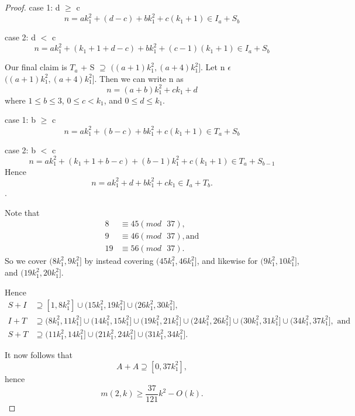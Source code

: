\begin{proof}
case 1: d $\geq$ c
\[
n = ak_1^2 + (d - c) + bk_1^2 + c(k_1 + 1) \in I_a + S_b
\]

case 2: d $<$ c
\[
n = ak_1^2 + (k_1 + 1 + d - c) + bk_1^2 + (c - 1)(k_1 + 1) \in  I_a + S_b
\]

Our final claim is $T_a$ + S $\supseteq$ $((a +1)k_1^2 ,  (a + 4)k_1^2]$. 
Let n $\epsilon$ $((a +1)k_1^2 ,  (a + 4)k_1^2]$.
Then we can write n as 
\[
n = (a + b) k_1^2 + ck_1 + d 
\]
where $1 \leq b \leq 3$, $0 \leq c < k_1$, and $0 \leq d \leq k_1$. 

case 1: b $\geq$ c
\[
n = ak_1^2 + (b - c) + bk_1^2 + c(k_1 + 1) \in T_a + S_b
\]

case 2: b $<$ c
\[
n = ak_1^2 + (k_1 + 1 + b - c) + (b - 1)k_1^2 + c(k_1 + 1) \in  T_a + S_{b-1}
\]
Hence 
\[
n = ak_1^2 + d + bk_1^2 + ck_1 \in I_a + T_b.
\].

Note that
\begin{align*}
8 &\equiv 45 (mod\text{ }37),\\
 9 &\equiv 46 (mod\text{ }37),  \text{and} \\
19 &\equiv 56 (mod\text{ }37).
\end{align*} 
So we cover $(8k_1^2, 9k_1^2]$ by instead covering $(45k_1^2, 46k_1^2]$, and likewise for $(9k_1^2, 10k_1^2]$, and $(19k_1^2, 20k_1^2]$. 

Hence 
\begin{align*}
S + I &\supseteq [1, 8k_1^2] \cup (15k_1^2, 19k_1^2] \cup (26k_1^2, 30k_1^2],\\
I + T &\supseteq (8k_1^2, 11k_1^2] \cup (14k_1^2, 15k_1^2] \cup (19k_1^2, 21k_1^2] \cup (24k_1^2, 26k_1^2] \cup (30k_1^2, 31k_1^2] \cup (34k_1^2, 37k_1^2],\text{ and}\\
S + T &\supseteq (11k_1^2, 14k_1^2] \cup (21k_1^2, 24k_1^2] \cup (31k_1^2, 34k_1^2]. 
\end{align*}

It now follows that 
\[
A + A \supseteq [0, 37k_1^2],
\]
hence
\[
m(2,k) \geq \frac{37}{121}k^2 - O(k). 
\]


\end{proof}
